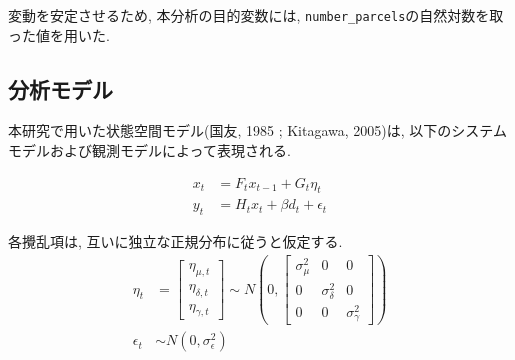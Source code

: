 \documentclass{bcsj}
\begin{document}
\begin{table}[htbp]
  \centering
  \caption{主要変数一覧}
  \label{tab:data_columns}
\end{table}

変動を安定させるため, 本分析の目的変数には, \texttt{number\_parcels}の自然対数を取った値を用いた.
\subsection{分析モデル}
本研究で用いた状態空間モデル(国友, 1985 ; Kitagawa, 2005)は, 以下のシステムモデルおよび観測モデルによって表現される. 

\begin{align}
    x_t &= F_t x_{t-1} + G_t \eta_{t} \label{eq:system_model} \\
    y_t &= H_t x_t + \beta d_t + \epsilon_t \label{eq:observation_model}
\end{align}

各攪乱項は, 互いに独立な正規分布に従うと仮定する. 
\begin{align}
    \eta_t &=
    \begin{bmatrix}
      \eta_{\mu,t}  \\ %
      \eta_{\delta,t} \\ %
      \eta_{\gamma,t}  %
    \end{bmatrix}
    \sim N \left( 0, 
    \begin{bmatrix}
      \sigma_{\mu}^2 & 0 & 0 \\
      0 & \sigma_{\delta}^2 & 0 \\
      0 & 0 & \sigma_{\gamma}^2
    \end{bmatrix} \right) \label{eq:eta_dist} \\
    \epsilon_t &\sim N( 0, \sigma_{\epsilon}^2) \label{eq:epsilon_dist}
\end{align}
\end{document}
